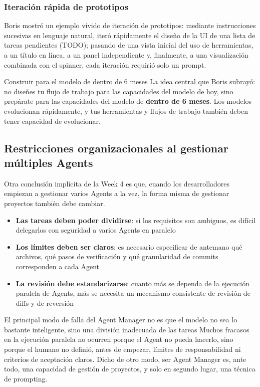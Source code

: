 \documentclass[a4paper]{article}
\begin{document}
\subsubsection{Iteración rápida de prototipos}

Boris mostró un ejemplo vívido de iteración de prototipos: mediante instrucciones sucesivas en lenguaje natural, iteró rápidamente el diseño de la UI de una lista de tareas pendientes (TODO); pasando de una vista inicial del uso de herramientas, a un título en línea, a un panel independiente y, finalmente, a una visualización combinada con el spinner, cada iteración requirió solo un prompt.

\begin{importantbox}{Construir para el modelo de dentro de 6 meses}
La idea central que Boris subrayó: no diseñes tu flujo de trabajo para las capacidades del modelo de hoy, sino prepárate para las capacidades del modelo de \textbf{dentro de 6 meses}. Los modelos evolucionan rápidamente, y tus herramientas y flujos de trabajo también deben tener capacidad de evolucionar.
\end{importantbox}

\subsection{Restricciones organizacionales al gestionar múltiples Agents}

Otra conclusión implícita de la Week 4 es que, cuando los desarrolladores empiezan a gestionar varios Agents a la vez, la forma misma de gestionar proyectos también debe cambiar.

\begin{itemize}
    \item \textbf{Las tareas deben poder dividirse}: si los requisitos son ambiguos, es difícil delegarlos con seguridad a varios Agents en paralelo
    \item \textbf{Los límites deben ser claros}: es necesario especificar de antemano qué archivos, qué pasos de verificación y qué granularidad de commits corresponden a cada Agent
    \item \textbf{La revisión debe estandarizarse}: cuanto más se dependa de la ejecución paralela de Agents, más se necesita un mecanismo consistente de revisión de diffs y de reversión
\end{itemize}

\begin{warningbox}{El principal modo de falla del Agent Manager no es que el modelo no sea lo bastante inteligente, sino una división inadecuada de las tareas}
Muchos fracasos en la ejecución paralela no ocurren porque el Agent no pueda hacerlo, sino porque el humano no definió, antes de empezar, límites de responsabilidad ni criterios de aceptación claros. Dicho de otro modo, ser Agent Manager es, ante todo, una capacidad de gestión de proyectos, y solo en segundo lugar, una técnica de prompting.
\end{warningbox}
\end{document}
